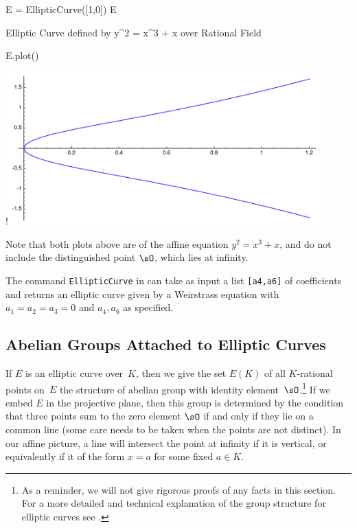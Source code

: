 \begin{sagecode}
\begin{sagecell}
E = EllipticCurve([1,0])
E
\end{sagecell}
\begin{sageout}
Elliptic Curve defined by y^2 = x^3 + x over
Rational Field
\end{sageout}
\end{sagecode}
\begin{sagecode}
\begin{sagecell} %
E.plot()
\end{sagecell}
\begin{sageout}[escapechar=!]
!\includegraphics[width=0.9\textwidth]{img/ecq}
\end{sageout}
\end{sagecode}

Note that both plots above are of the affine equation $y^2 = x^3 + x$, and do
not include the distinguished point $\sO$, which lies at infinity.

\begin{remark}
  The command {\tt{EllipticCurve}} in {\Sage}
  can take as input a list {\tt{[a4,a6]}}
  of coefficients and returns an elliptic curve given
  by a Weirstrass equation with $a_1=a_2=a_3=0$ and
  $a_4,a_6$ as specified.
\end{remark}

\subsection{Abelian Groups Attached to Elliptic Curves}

If $E$ is an elliptic curve over~$K$, then we give the set
$E(K)$ of all $K$-rational points on~$E$ the structure of abelian
group with identity element~$\sO$.\footnote{
  As a reminder, we will not give rigorous proofs of any facts in
  this section. For a more detailed and technical explanation of
  the group structure for elliptic curves
  see \cite[Ch.~III.2]{silverman:aec}.
} 
If we embed $E$ in the projective plane, then this group is determined
by the condition that three points sum to the zero element $\sO$
if and only if they lie on a common line (some care needs to be taken
when the points are not distinct). In our affine picture, a line will
intersect the point at infinity if it is vertical, or equivalently if
it of the form $x=a$ for some fixed $a\in K$.


